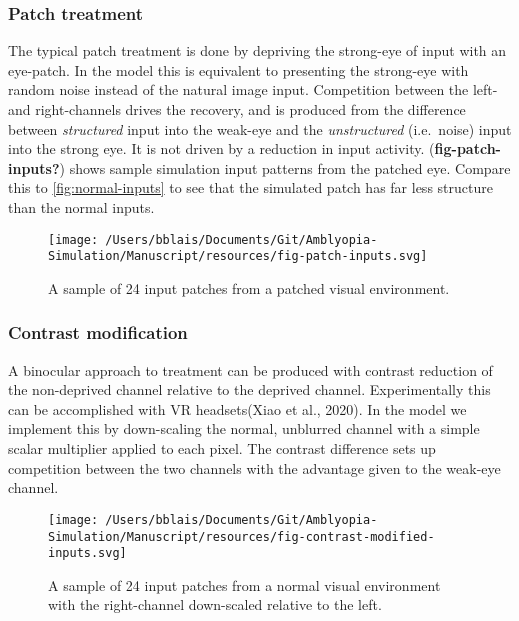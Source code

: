 \documentclass[
  onecolumn]{article}
\begin{document}
\hypertarget{patch-treatment}{%
\subsubsection{Patch treatment}\label{patch-treatment}}

The typical patch treatment is done by depriving the strong-eye of input
with an eye-patch. In the model this is equivalent to presenting the
strong-eye with random noise instead of the natural image input.
Competition between the left- and right-channels drives the recovery,
and is produced from the difference between \emph{structured} input into
the weak-eye and the \emph{unstructured} (i.e.~noise) input into the
strong eye. It is not driven by a reduction in input activity.
(\textbf{fig-patch-inputs?}) shows sample simulation input patterns from
the patched eye. Compare this to \ref{fig:normal-inputs} to see that the
simulated patch has far less structure than the normal inputs.

\begin{figure}
\hypertarget{fig:patch-inputs}{%
\centering
\texttt{[image: /Users/bblais/Documents/Git/Amblyopia-Simulation/Manuscript/resources/fig-patch-inputs.svg]}
\caption{A sample of 24 input patches from a patched visual
environment.}\label{fig:patch-inputs}
}
\end{figure}

\hypertarget{contrast-modification}{%
\subsubsection{Contrast modification}\label{contrast-modification}}

A binocular approach to treatment can be produced with contrast
reduction of the non-deprived channel relative to the deprived channel.
Experimentally this can be accomplished with VR headsets(Xiao et al.,
2020). In the model we implement this by down-scaling the normal,
unblurred channel with a simple scalar multiplier applied to each pixel.
The contrast difference sets up competition between the two channels
with the advantage given to the weak-eye channel.

\begin{figure}
\hypertarget{fig:contrast-modified-inputs}{%
\centering
\texttt{[image: /Users/bblais/Documents/Git/Amblyopia-Simulation/Manuscript/resources/fig-contrast-modified-inputs.svg]}
\caption{A sample of 24 input patches from a normal visual environment
with the right-channel down-scaled relative to the
left.}\label{fig:contrast-modified-inputs}
}
\end{figure}
\end{document}
